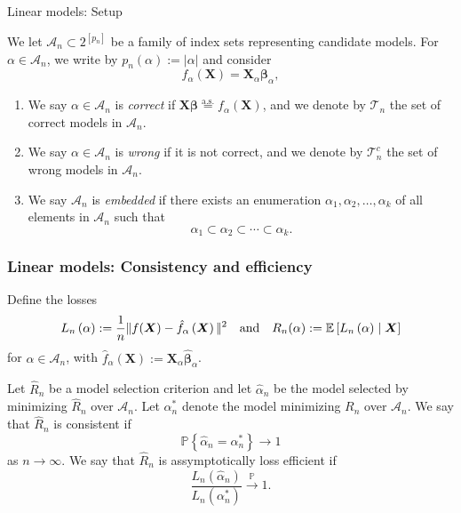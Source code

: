 \documentclass{beamer}
\newcommand{\0}{\emptyset}
\newcommand{\prob}{\mathbb{P}}
\newcommand{\Ep}[1]{\mathbb{E}\left[ #1 \right]}
\newcommand{\paren}[1]{\left(#1 \right)}
\newcommand{\set}[1]{\left\{ #1 \right\}}
\newcommand{\norm}[1]{|\hspace{-1pt}|#1 |\hspace{-1pt}|}
\newcommand{\normsq}[1]{\norm{#1}^{2}}
\newcommand{\Acal}{\mathcal{A}_{n}}
\newcommand{\Tcal}{\mathcal{T}_{n}}
\newcommand{\aseq}{\stackrel{\mathrm{a.s.}}{=}}
\newcommand{\X}{\boldsymbol{X}}
\newcommand{\bbeta}{\boldsymbol{\beta}}
\newcommand{\bbetahat}{\boldsymbol{\hat{\beta}}}
\newcommand{\Loss}[1]{L_{n}\paren{#1}}
\newcommand{\alphahat}[1]{\hat{\alpha}^{#1}}
\newcommand{\1}{\mathmybb{1}}
\begin{document}
\begin{frame}{Linear models: Setup}
    
    We let \(\Acal\subset2^{[p_{n}]}\) be a family of index sets representing candidate models. For \(\alpha\in\Acal\), we write by \(p_{n}(\alpha) := |\alpha|\) and consider
    \[f_{\alpha}(\X) = \X_{\alpha}\bbeta_{\alpha},\]

    \begin{enumerate}
        \item We say \(\alpha\in\Acal\) is \emph{correct} if \(\X\bbeta\aseq f_{\alpha}(\X)\), and we denote by \(\Tcal\) the set of correct models in \(\Acal\).
        \item We say \(\alpha\in\Acal\) is \emph{wrong} if it is not correct, and we denote by \(\Tcal^{c}\) the set of wrong models in \(\Acal\).
        \item We say \(\Acal\) is \emph{embedded} if there exists an enumeration \(\alpha_{1}, \alpha_{2}, \ldots, \alpha_{k}\) of all elements in \(\Acal\) such that \[\alpha_{1}\subset\alpha_{2}\subset\cdots\subset\alpha_{k}.\]
\end{enumerate}



\end{frame}

\begin{frame}
    \frametitle{Linear models: Consistency and efficiency}
    Define the losses
    \[\Loss{\alpha}:=\frac{1}{n}\normsq{f(\X) - \hat{f}_{\alpha}\paren{\X}}\quad\text{and}\quad R_{n}(\alpha):= \Ep{\Loss{\alpha}\mid\X}\]
    for \(\alpha\in\Acal\), with \(\hat{f}_{\alpha}(\X):=\X_{\alpha}\bbetahat_{\alpha}\).

    Let \(\hat{R}_{n}\) be a model selection criterion and let \(\alphahat{}_{n}\) be the model selected by minimizing \(\hat{R}_{n}\) over \(\Acal\). Let \(\alpha^{*}_{n}\) denote the model minimizing \(R_{n}\) over \(\Acal\). We say that \(\hat{R}_{n}\) is \alert{consistent} if 
    \[\prob\set{\alphahat{}_{n} = \alpha^{*}_{n}}\to 1\]
    as \(n\to\infty\). We say that \(\hat{R}_{n}\) is \alert{assymptotically loss efficient} if 
    \[\frac{L_{n}(\alphahat{}_{n})}{L_{n}(\alpha^{*}_{n})}\xrightarrow{\prob} 1.\]
  
\end{frame}
\end{document}
